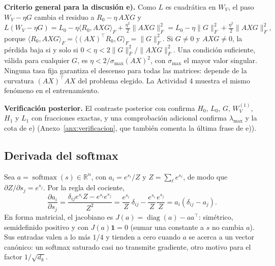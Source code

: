 \documentclass[10pt]{article}
\newcommand{\R}{\mathbb{R}}
\begin{document}
\textbf{Criterio general para la discusión e).} Como $L$ es cuadrática en $W_V$, el paso
$W_V - \eta G$ cambia el residuo a $R_0 - \eta\,AXG$ y
\[
  L(W_V - \eta G) = L_0 - \eta\langle R_0, AXG\rangle_F + \tfrac{\eta^2}{2}\|AXG\|_F^2
                  = L_0 - \eta\|G\|_F^2 + \tfrac{\eta^2}{2}\|AXG\|_F^2 ,
\]
porque $\langle R_0, AXG\rangle_F = \langle (AX)^\top R_0, G\rangle_F = \|G\|_F^2$. Si $G\neq0$ y
$AXG\neq0$, la pérdida baja si y solo si $0<\eta<2\|G\|_F^2/\|AXG\|_F^2$. Una condición suficiente,
válida para cualquier $G$, es $\eta < 2/\sigma_{\max}(AX)^2$, con $\sigma_{\max}$ el mayor valor
singular. Ninguna tasa fija garantiza el descenso para todas las matrices: depende de la curvatura
$(AX)^\top AX$ del problema elegido. La Actividad 4 muestra el mismo fenómeno en el entrenamiento.

\textbf{Verificación posterior.} El contraste posterior con 
confirma $H_0$, $L_0$, $G$, $W_V^{(1)}$, $H_1$ y $L_1$ con fracciones exactas, y una comprobación
adicional confirma $\lambda_{\max}$ y la cota de e) (Anexo~\ref{anx:verificacion}, que también comenta
la última frase de e)).

\subsection{Derivada del softmax}
Sea $a = \operatorname{softmax}(s)\in\R^n$, con $a_i = e^{s_i}/Z$ y $Z = \sum_\ell e^{s_\ell}$, de modo
que $\partial Z/\partial s_j = e^{s_j}$. Por la regla del cociente,
\[
  \frac{\partial a_i}{\partial s_j}
  = \frac{\delta_{ij}e^{s_i}Z - e^{s_i}e^{s_j}}{Z^2}
  = \frac{e^{s_i}}{Z}\,\delta_{ij} - \frac{e^{s_i}}{Z}\frac{e^{s_j}}{Z}
  = a_i(\delta_{ij} - a_j).
\]
En forma matricial, el jacobiano es $J(a) = \operatorname{diag}(a) - aa^\top$: simétrico, semidefinido
positivo y con $J(a)\mathbf 1 = 0$ (sumar una constante a $s$ no cambia $a$). Sus entradas valen a lo
más $1/4$ y tienden a cero cuando $a$ se acerca a un vector canónico: un softmax saturado casi no
transmite gradiente, otro motivo para el factor $1/\sqrt{d_k}$.
\end{document}
